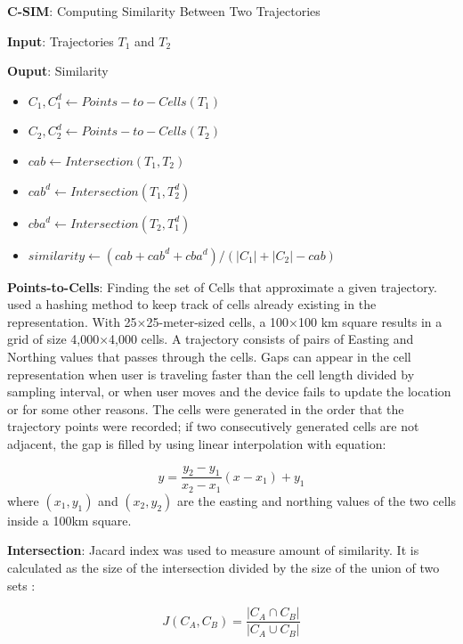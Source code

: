 \documentclass[a4paper, 12pt]{article}
\begin{document}
\textbf{C-SIM}: Computing Similarity Between Two Trajectories

\textbf{Input}: Trajectories $T_{1}$ and $T_{2}$

\textbf{Ouput}: Similarity

\begin{itemize}
    \item $C_{1}, C_{1}^d \leftarrow Points-to-Cells(T_{1})$
    \item $C_{2}, C_{2}^d \leftarrow Points-to-Cells(T_{2})$
    \item $cab \leftarrow Intersection(T_{1}, T_{2})$
    \item $cab^d \leftarrow Intersection(T_{1}, T_{2}^d)$
    \item $cba^d \leftarrow Intersection(T_{2}, T_{1}^d)$
    \item $similarity \leftarrow (cab + cab^d + cba^d)/(|C_{1}| + |C_{2}| - cab)$
\end{itemize}

\textbf{Points-to-Cells}: Finding the set of Cells that approximate a given trajectory. \cite{mariescu2017grid} used a hashing method to keep track of cells already existing in the representation. With 25×25-meter-sized cells, a 100×100 km square results in a grid of size 4,000×4,000 cells. A trajectory consists of pairs of Easting and Northing values that passes through the cells. Gaps can appear in the cell representation when user is traveling faster than the cell length divided by sampling interval, or when user moves and the device fails to update the location or for some other reasons. The cells were generated in the order that the trajectory points were recorded; if two consecutively generated cells are not adjacent, the gap is filled by using linear interpolation with equation:

\begin{equation} \label{eq11}
    y = \frac{y_2 - y_1}{x_2 - x_1}(x - x_1) + y_1
\end{equation}
where $(x_1, y_1)$ and $(x_2, y_2)$ are the easting and northing values of the two cells inside a 100km square.

\textbf{Intersection}: Jacard index was used to measure amount of similarity. It is calculated as the size of the intersection divided by the size of the union of two sets \citep{mariescu2017grid}:

\begin{equation} \label{eq12}
    J(C_A, C_B) = \frac{|C_A \cap C_B|}{|C_A \cup C_B|}
\end{equation}
\end{document}
